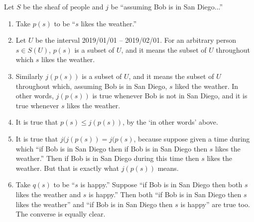 \documentclass[7Sketches]{subfiles}
\begin{document}
{
Let $S$ be the sheaf of people and $j$ be ``assuming Bob is in San Diego...''
\begin{enumerate}
	\item Take $p(s)$ to be ``$s$ likes the weather.''
	\item Let $U$ be the interval 2019/01/01 -- 2019/02/01. For an arbitrary person $s\in S(U)$, $p(s)$ is a subset of $U$, and it means the subset of $U$ throughout which $s$ likes the weather.
	\item Similarly $j(p(s))$ is a subset of $U$, and it means the subset of $U$ throughout which, assuming Bob is in San Diego, $s$ liked the weather. In other words, $j(p(s))$ is true whenever Bob is not in San Diego, and it is true whenever $s$ likes the weather.
	\item It is true that $p(s)\leq j(p(s))$, by the `in other words' above.
	\item It is true that $j(j(p(s))=j(p(s)$, because suppose given a time during which ``if Bob is in San Diego then if Bob is in San Diego then $s$ likes the weather.'' Then if Bob is in San Diego during this time then $s$ likes the weather. But that is exactly what $j(p(s))$ means.
	\item Take $q(s)$ to be ``$s$ is happy.'' Suppose ``if Bob is in San Diego then both $s$ likes the weather and $s$ is happy.'' Then both ``if Bob is in San Diego then $s$ likes the weather'' and ``if Bob is in San Diego then $s$ is happy'' are true too. The converse is equally clear.
\end{enumerate}
}
\end{document}
